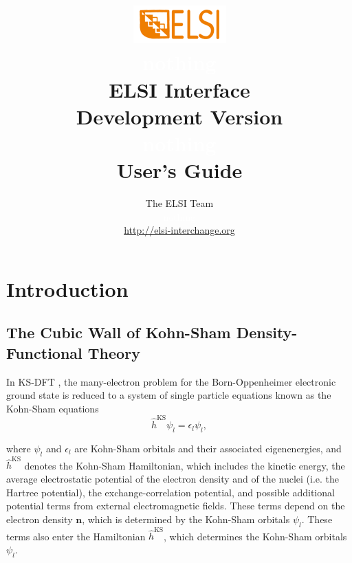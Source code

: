 \documentclass{report}
\begin{document}
\title{\includegraphics[scale=0.07]{elsi_logo.png}\\ \textcolor{white}{nothing}\\ \textbf{ELSI Interface\\ Development Version\\ \textcolor{white}{nothing} \\ User's Guide}}
\author{The ELSI Team\\ \textcolor{white}{nothing}\\ \url{http://elsi-interchange.org}}
\maketitle

\tableofcontents

\chapter{Introduction}
\section{The Cubic Wall of Kohn-Sham Density-Functional Theory}
\label{sec:ksdft}
In KS-DFT \cite{ks_kohn_1965}, the many-electron problem for the Born-Oppenheimer electronic ground state is reduced to a system of single particle equations known as the Kohn-Sham equations\\
\begin{equation}
\label{eq:ks}
\hat{h}^\text{KS} \psi_l = \epsilon_l \psi_l ,
\end{equation}

where $\psi_l$ and $\epsilon_l$ are Kohn-Sham orbitals and their associated eigenenergies, and $\hat{h}^\text{KS}$ denotes the Kohn-Sham Hamiltonian, which includes the kinetic energy, the average electrostatic potential of the electron density and of the nuclei (i.e. the Hartree potential), the exchange-correlation potential, and possible additional potential terms from external electromagnetic fields.  These terms depend on the electron density $\boldsymbol{n}$, which is determined by the Kohn-Sham orbitals $\psi_l$.  These terms also enter the Hamiltonian $\hat{h}^\text{KS}$, which determines the Kohn-Sham orbitals $\psi_l$.\\
\end{document}
